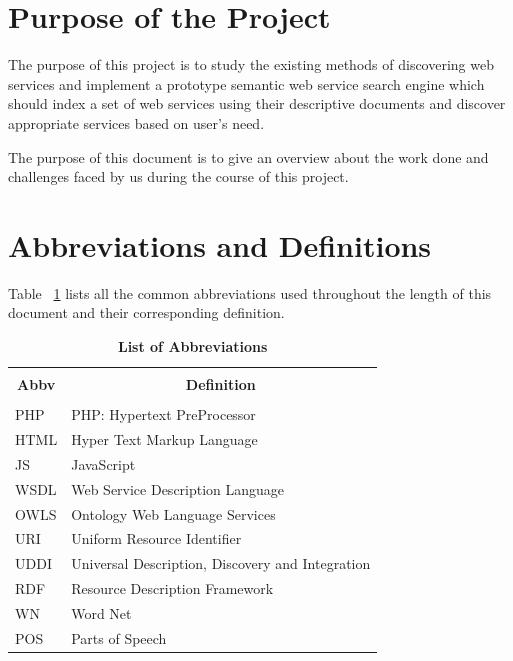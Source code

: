 \documentclass[12pt, oneside]{book}
\begin{document}
\section{Purpose of the Project}
The purpose of this project is to study the existing methods of discovering web services and implement a prototype semantic web service search engine which should index a set of web services using their descriptive documents and discover appropriate services based on user's need. \\ \par
The purpose of this document is to give an overview about the work done and challenges faced by us during the course of this project.

\section{Abbreviations and Definitions}
Table ~\ref{tab: abbv} lists all the common abbreviations used throughout the length of this document and their corresponding definition.
\begin{table}[h]
	\begin{center}
		\caption{\textbf{List of Abbreviations}}
		\label{tab: abbv}
		\begin{tabular}{| p{} | p{} |}
			\hline
			\multicolumn{1}{|c|}{} & \multicolumn{1}{c|}{} \\
			\multicolumn{1}{|c|}{\textbf{Abbv}} & \multicolumn{1}{c|}{\textbf{Definition}} \\
			\multicolumn{1}{|c|}{} & \multicolumn{1}{c|}{} \\
			\hline
			PHP & PHP: Hypertext PreProcessor \\ \hline
			HTML & Hyper Text Markup Language \\ \hline
			JS & JavaScript \\ \hline
			WSDL & Web Service Description Language \\ \hline
			OWLS & Ontology Web Language Services \\ \hline
			URI & Uniform Resource Identifier \\ \hline
			UDDI & Universal Description, Discovery and Integration \\ \hline
			RDF & Resource Description Framework \\ \hline
			WN & Word Net \\ \hline
			POS & Parts of Speech \\ \hline
		\end{tabular}
	\end{center}
\end{table}
\end{document}
